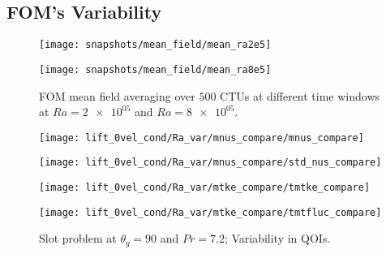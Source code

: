 \subsection{FOM's Variability}
\begin{figure}[h!]
    \begin{minipage}[b]{.5\linewidth}
   \centering 
   \texttt{[image: snapshots/mean\_field/mean\_ra2e5]}
    \end{minipage}%
    \begin{minipage}[b]{.5\linewidth}
   \texttt{[image: snapshots/mean\_field/mean\_ra8e5]}
    \end{minipage}%
   \caption{FOM mean field averaging over $500$ CTUs at different
   time windows at $Ra=\num{2e+05}$ and $Ra=\num{8e+05}$.}
\label{fig:slot_pr_7.2_fom_mean} \end{figure}
\begin{figure}[h!]
    \begin{minipage}[b]{.25\linewidth}
   \centering 
   \texttt{[image: lift\_0vel\_cond/Ra\_var/mnus\_compare/mnus\_compare]}
    \end{minipage}%
    \begin{minipage}[b]{.25\linewidth}
   \centering 
   \texttt{[image: lift\_0vel\_cond/Ra\_var/mnus\_compare/std\_nus\_compare]}
    \end{minipage}%
    \begin{minipage}[b]{.25\linewidth}
   \centering 
   \texttt{[image: lift\_0vel\_cond/Ra\_var/mtke\_compare/tmtke\_compare]}
    \end{minipage}%
    \begin{minipage}[b]{.25\linewidth}
   \centering 
   \texttt{[image: lift\_0vel\_cond/Ra\_var/mtke\_compare/tmtfluc\_compare]}
    \end{minipage}%
   \caption{Slot problem at $\theta_g=90$ and $Pr=7.2$; Variability in QOIs.}
\label{fig:slot_pr_7.2_fom_mean} \end{figure}
